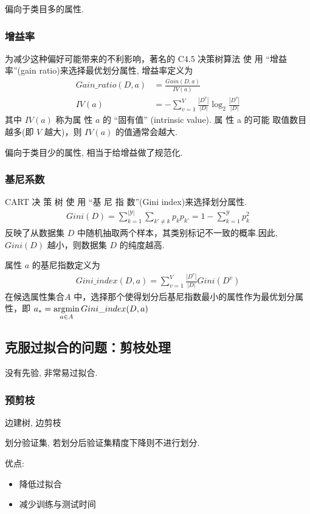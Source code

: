 偏向于类目多的属性. 

\subsubsection{增益率}
为减少这种偏好可能带来的不利影响，著名的 C4.5 决策树算法 使 用 ``增益率''(gain ratio)来选择最优划分属性, 增益率定义为
\begin{align*}
    Gain\_ratio(D,a)&=\frac{Gain(D,a)}{IV(a)}\\
    IV(a)&=-\sum_{v=1}^V\frac{|D^v|}{|D|}\log_2 \frac{|D^v|}{|D|}
\end{align*}
其中 $IV(a)$ 称为属 性 $a$ 的 ``固有值'' (intrinsic value). 属 性 a 的可能
取值数目越多(即 $V$ 越大)，则 $IV(a)$ 的值通常会越大. 

偏向于类目少的属性, 相当于给增益做了规范化. 

\subsubsection{基尼系数}
CART 决 策 树 使 用 ``基 尼 指 数''(Gini index)来选择划分属性. 
\begin{align*}
    Gini(D)=\sum_{k=1}^{|\mathcal{Y}|}\sum_{k'\ne k}p_kp_{k'}=1-\sum_{k=1}^{\mathcal{Y}}p_k^2
\end{align*}
反映了从数据集 $D$ 中随机抽取两个样本，其类别标记不一致的概率.因此, $Gini(D)$ 越小，则数据集 $D$ 的纯度越高. 

属性 $a$ 的基尼指数定义为
\begin{align*}
    Gini\_index(D,a)=\sum_{v=1}^V\frac{|D^v|}{|D|}Gini(D^v)
\end{align*}
在候选属性集合$A$ 中，选择那个使得划分后基尼指数最小的属性作为最优划分属性，即 $\displaystyle a_*=\operatorname*{argmin}_{a\in A}Gini\_index(D,a)$


\subsection{克服过拟合的问题：剪枝处理}
没有先验, 非常易过拟合. 

\subsubsection{预剪枝}
边建树, 边剪枝

划分验证集, 若划分后验证集精度下降则不进行划分. 

优点:
\begin{itemize}
    \item 降低过拟合
    \item 减少训练与测试时间
\end{itemize}

